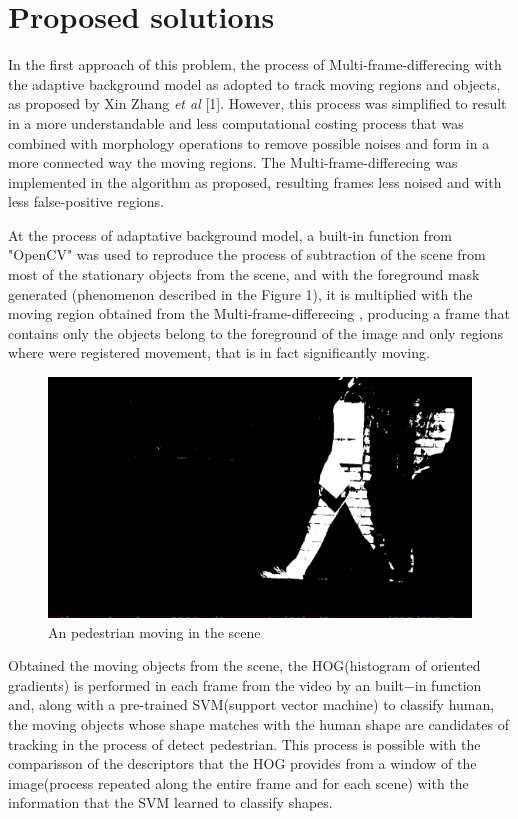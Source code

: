 \documentclass[conference]{IEEEtran}
\begin{document}
\section{Proposed solutions}

	In the first approach of this problem, the process of Multi-frame-differecing with the adaptive background model as adopted to track moving regions and objects, as proposed by Xin Zhang \textit{et al} [1]. However, this process was simplified to result in a more understandable and less computational costing process that was combined with morphology operations to remove possible noises and form in a more connected way the moving regions. The Multi-frame-differecing was implemented in the algorithm as proposed, resulting frames less noised and with less false-positive regions.
	
	At the process of adaptative background model, a built-in function from "OpenCV" was used to reproduce the process of subtraction of the scene from most of the stationary objects from the scene, and with the foreground mask generated (phenomenon described in the Figure 1), it is multiplied with the moving region obtained from the Multi-frame-differecing , producing a frame that contains only the objects belong to the foreground of the image and only regions where were registered movement, that is in fact significantly moving.

	\begin{figure}[htbp]
	\centerline{\includegraphics[scale=0.5]{background_sub.png}}
	\caption{An pedestrian moving in the scene}
	\label{fig}
	\end{figure}
	
	Obtained the moving objects from the scene, the HOG(histogram of oriented gradients) is performed in each frame from the video by an built$-$in function and, along with a pre-trained SVM(support vector machine) to classify human, the moving objects whose shape matches with the human shape are candidates of tracking in the process of detect pedestrian. This process is possible with the comparisson of the descriptors that the HOG provides from a window of the image(process repeated along the entire frame and for each scene) with the information that the SVM learned to classify shapes.	
	
\end{document}
